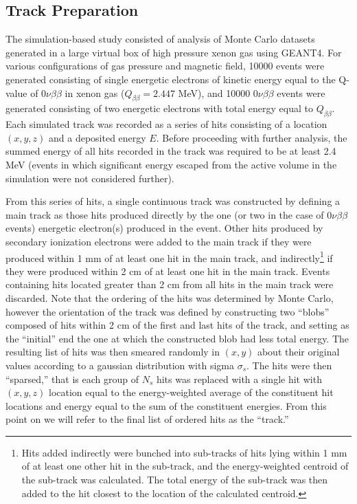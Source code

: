 \documentclass{JINST}
\begin{document}
\subsection{Track Preparation}\label{ssec:track}
The simulation-based study consisted of analysis of Monte Carlo datasets generated in a large virtual box of high pressure xenon gas using GEANT4.  For various configurations of gas pressure and magnetic field, 10000 events were generated consisting of single energetic electrons of kinetic energy equal to the Q-value of $0\nu\beta\beta$ in xenon gas ($Q_{\beta\beta} = 2.447$ MeV), and 10000 $0\nu\beta\beta$ events were generated consisting of two energetic electrons with total energy equal to $Q_{\beta\beta}$.  Each simulated track was recorded as a series of hits consisting of a location $(x,y,z)$ and a deposited energy $E$.  Before proceeding with further analysis, the summed energy of all hits recorded in the track was required to be at least 2.4 MeV (events in which significant energy escaped from the active volume in the simulation were not considered further).

From this series of hits, a single continuous track was constructed by defining a main track as those hits produced directly by the one (or two in the case of $0\nu\beta\beta$ events) energetic electron(s) produced in the event.  Other hits produced by secondary ionization electrons were added to the main track if they were produced within 1 mm of at least one hit in the main track, and indirectly\footnote{Hits added indirectly were bunched into sub-tracks of hits lying within 1 mm of at least one other hit in the sub-track, and the energy-weighted centroid of the sub-track was calculated.  The total energy of the sub-track was then added to the hit closest to the location of the calculated centroid.} if they were produced within 2 cm of at least one hit in the main track.  Events containing hits located greater than 2 cm from all hits in the main track were discarded.  Note that the ordering of the hits was determined by Monte Carlo, however the orientation of the track was defined by constructing two ``blobs'' composed of hits within 2 cm of the first and last hits of the track, and setting as the ``initial'' end the one at which the constructed blob had less total energy.  The resulting list of hits was then smeared randomly in $(x,y)$ about their original values according to a gaussian distribution with sigma $\sigma_{s}$.  The hits were then ``sparsed,'' that is each group of $N_{s}$ hits was replaced with a single hit with $(x,y,z)$ location equal to the energy-weighted average of the constituent hit locations and energy equal to the sum of the constituent energies.  From this point on we will refer to the final list of ordered hits as the ``track.''
\end{document}
